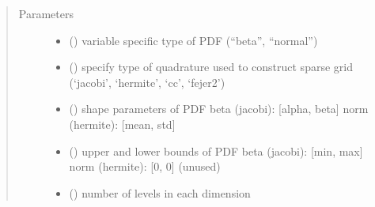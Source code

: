 \documentclass[letterpaper,10pt,english,openany,oneside]{sphinxmanual}
\begin{document}
\begin{fulllineitems}
\begin{fulllineitems}
\begin{quote}
\begin{description}
\end{description}\end{quote}

\end{fulllineitems}

\begin{quote}\begin{description}
\item[{Parameters}] \leavevmode\begin{itemize}
\item {} 
 (\sphinxstyleliteralemphasis{\sphinxupquote{{[}}}\sphinxstyleliteralemphasis{\sphinxupquote{{]} }}) \textendash{} variable specific type of PDF (“beta”, “normal”)

\item {} 
 (\sphinxstyleliteralemphasis{\sphinxupquote{{[}}}\sphinxstyleliteralemphasis{\sphinxupquote{{]} }}) \textendash{} specify type of quadrature used to construct sparse grid (‘jacobi’, ‘hermite’, ‘cc’, ‘fejer2’)

\item {} 
 (\sphinxstyleliteralemphasis{\sphinxupquote{{[}}}\sphinxstyleliteralemphasis{\sphinxupquote{{]} }}) \textendash{} shape parameters of PDF
beta (jacobi):  {[}alpha, beta{]}
norm (hermite): {[}mean, std{]}

\item {} 
 (\sphinxstyleliteralemphasis{\sphinxupquote{{[}}}\sphinxstyleliteralemphasis{\sphinxupquote{{]} }}) \textendash{} upper and lower bounds of PDF
beta (jacobi):  {[}min, max{]}
norm (hermite): {[}0, 0{]} (unused)

\item {} 
 (\sphinxstyleliteralemphasis{\sphinxupquote{{[}}}\sphinxstyleliteralemphasis{\sphinxupquote{{]} }}) \textendash{} number of levels in each dimension


\end{itemize}
\end{description}
\end{quote}
\end{fulllineitems}
\end{document}
